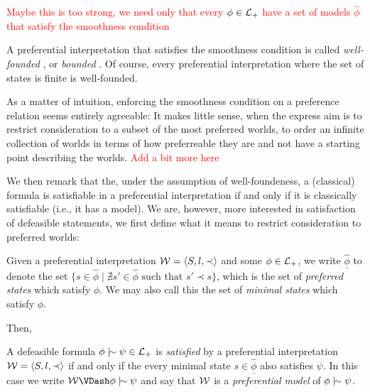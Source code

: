 \textcolor{red}{Maybe this is too strong, we need only that every $\phi \in \mathcal{L}_+$ have a set of models $\hat{\phi}$ that
satisfy the smoothness condition}

A preferential interpretation that satisfies the smoothness condition is called \textit{well-founded} \cite{lehmann1992what},
or \textit{bounded} \cite{shohamSemanticApproach}. Of course, every preferential interpretation where the set of states is
finite is well-founded.

As a matter of intuition, enforcing the smoothness condition on a preference relation seems entirely agreeable: It makes
little sense, when the express aim is to restrict consideration to a subset of the most preferred worlds, to order an infinite
collection of worlds in terms of how preferreable they are and not have a starting point describing the 
worlds. \textcolor{red}{Add a bit more here}

We then remark that the, under the assumption of well-foundeness, a (classical) formula is satisfiable in a preferential
interpretation if and only if it is classically satisfiable (i.e., it has a model). We are, however, more interested in
satisfaction of defeasible statements, we first define what it means to restrict consideration to preferred worlds:

\begin{definition}
	\label{definition:state-minimal}

	Given a preferential interpretation $\mathcal{W} = \langle S,l,\prec \rangle$ and some $\phi \in \mathcal{L}_+$, we write $\underline{\hat{\phi}}$ to denote the set
	$\{s \in \hat{\phi}\mid \nexists s' \in \hat{\phi}\text{ such that }s' \prec s \}$, which is the set of \textit{preferred
	states} which satisfy $\phi$. We may also call this the set of \textit{minimal states} which satisfy $\phi$.
\end{definition}

Then,

\begin{definition}
	\label{definition:preferentially-satisfiable}

	A defeasible formula $\phi \twiddle \psi \in \Lang$ is \emph{satisfied} by a preferential interpretation $\mathcal{W} = \langle S,l,\prec \rangle$ if and
	only if the every minimal state $s \in \underline{\hat{\phi}}$ also satisfies $\psi$. In this case we write
	$\pin \VDash \phi \twiddle \psi$ and say that $\mathcal{W}$ is a \emph{preferential model} of $\phi \twiddle \psi$.
\end{definition}


